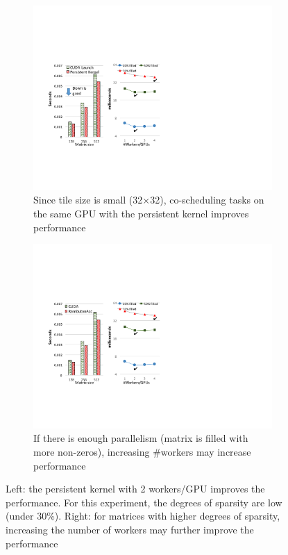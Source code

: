 \begin{figure}[htb]
\centering
\begin{subfigure}{0.25\textwidth}
\includegraphics[width=\textwidth]{figures/choleskyScheResults.pdf}
\caption{Since tile size is small (32$\times$32), co-scheduling tasks on the same GPU with the persistent kernel improves performance}
\label{choleskySche}
\end{subfigure}
\begin{subfigure}{0.222\textwidth}
\includegraphics[width=\textwidth]{figures/nWorkers.pdf}
\caption{If there is enough parallelism (matrix is filled with more non-zeros), increasing \#workers may increase performance}
\label{fig:nWorkers}
\end{subfigure}
\caption{Left: the persistent kernel with 2 workers/GPU improves the performance. For this experiment, the degrees of sparsity are low (under 30\%). Right: for matrices with higher degrees of sparsity, increasing the number of workers  may further improve the performance}
\label{fig:coarseFine}
\end{figure}

